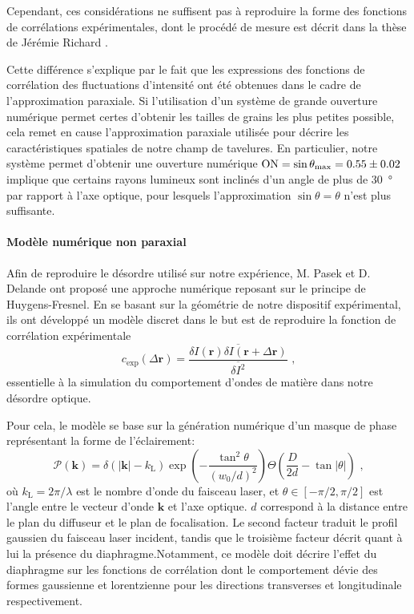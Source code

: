 Cependant, ces considérations ne suffisent pas à reproduire la forme des fonctions de corrélations expérimentales, dont le procédé de mesure est décrit dans la thèse de Jérémie Richard \citep{richard2015propagation}. 

Cette différence s'explique par le fait que les expressions des fonctions de corrélation des fluctuations d'intensité ont été obtenues dans le cadre de l'approximation paraxiale. Si l'utilisation d'un système de grande ouverture numérique permet certes d'obtenir les tailles de grains les plus petites possible, cela remet en cause l'approximation paraxiale utilisée pour décrire les caractéristiques spatiales de notre champ de tavelures. En particulier, notre système permet d'obtenir une ouverture numérique $\mathrm{ON}=\sin{\theta_{\mathrm{max}}}=0.55\pm 0.02$ implique que certains rayons lumineux sont inclinés d'un angle de plus de \SI{30}{\degree} par rapport à l'axe optique, pour lesquels l'approximation $\sin{\theta}=\theta$ n'est plus suffisante.



\paragraph*{Modèle numérique non paraxial}
Afin de reproduire le désordre utilisé sur notre expérience, M. Pasek et D. Delande ont proposé une approche numérique reposant sur le principe de Huygens-Fresnel. En se basant sur la géométrie de notre dispositif expérimental, ils ont développé un modèle discret dans le but est de reproduire la fonction de corrélation expérimentale
\begin{equation}
c_{\mathrm{exp}}(\Delta \mathbf{r})=\frac{\overline{\delta I(\mathbf{r}) \delta I(\mathbf{r} + \Delta \mathbf{r})}}{\overline{\delta I^2}} \text{ ,}
\end{equation}
essentielle à la simulation du comportement d'ondes de matière dans notre désordre optique.

Pour cela, le modèle se base sur la génération numérique d'un masque de phase représentant la forme de l'éclairement:
\begin{equation}
\mathcal{P}(\mathbf{k})=\delta(\left| \mathbf{k} \right| - k_{\mathrm{L}}) \exp{\left( - \frac{\tan^2 \theta}{(w_0/d)^2} \right)} \Theta \left( \frac{D}{2d}-\tan{\left| \theta \right|} \right) \text{ ,}
\label{eq:speckle_masque_phase}
\end{equation}
où $k_{\mathrm{L}}=2\pi/\lambda$ est le nombre d'onde du faisceau laser, et $\theta\in\left[ -\pi/2, \pi/2 \right]$ est l'angle entre le vecteur d'onde $\mathbf{k}$ et l'axe optique. $d$ correspond à la distance entre le plan du diffuseur et le plan de focalisation. Le second facteur traduit le profil gaussien du faisceau laser incident, tandis que le troisième facteur décrit quant à lui la présence du diaphragme.Notamment, ce modèle doit décrire l'effet du diaphragme sur les fonctions de corrélation dont le comportement dévie des formes gaussienne et lorentzienne pour les directions transverses et longitudinale respectivement. 

